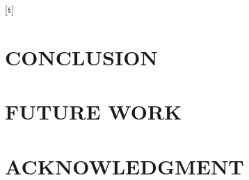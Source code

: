 \documentclass[letterpaper, 10 pt, conference]{ieeeconf}  %
\begin{document}
\begin{table}[t]
\end{table}[t]


\section{CONCLUSION}

\section{FUTURE WORK}


\addtolength{\textheight}{-12cm}   %








\section*{ACKNOWLEDGMENT}





\end{document}
